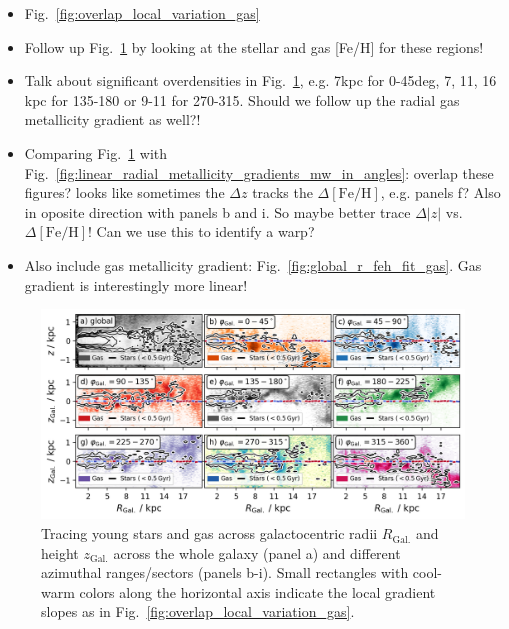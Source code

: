 \documentclass[fleqn,usenatbib]{mnras}
\begin{document}
\begin{itemize}
    \item Fig.~\ref{fig:overlap_local_variation_gas}
    \item Follow up Fig.~\ref{fig:tracing_young_stars_and_gas_in_angles} by looking at the stellar and gas [Fe/H] for these regions!
    \item Talk about significant overdensities in Fig.~\ref{fig:tracing_young_stars_and_gas_in_angles}, e.g. 7kpc for 0-45deg, 7, 11, 16 kpc for 135-180 or 9-11 for 270-315. Should we follow up the radial gas metallicity gradient as well?!
    \item Comparing Fig.~\ref{fig:tracing_young_stars_and_gas_in_angles} with Fig.~\ref{fig:linear_radial_metallicity_gradients_mw_in_angles}: overlap these figures? looks like sometimes the $\Delta z$ tracks the $\Delta\mathrm{[Fe/H]}$, e.g. panels f? Also in oposite direction with panels b and i. So maybe better trace $\Delta \vert z \vert$ vs. $\Delta \mathrm{[Fe/H]}$! Can we use this to identify a warp?
    \item Also include gas metallicity gradient: Fig.~\ref{fig:global_r_feh_fit_gas}. Gas gradient is interestingly more linear!
\end{itemize}

\begin{figure}
    \centering
    \includegraphics[width=\columnwidth]{figures/tracing_young_stars_and_gas_in_angles.png}
    \caption{Tracing young stars and gas across galactocentric radii $R_\mathrm{Gal.}$ and height $z_\mathrm{Gal.}$ across the whole galaxy (panel a) and different azimuthal ranges/sectors (panels b-i). Small rectangles with cool-warm colors along the horizontal axis indicate the local gradient slopes as in Fig.~\ref{fig:overlap_local_variation_gas}.}
    \label{fig:tracing_young_stars_and_gas_in_angles}
\end{figure}
\end{document}
